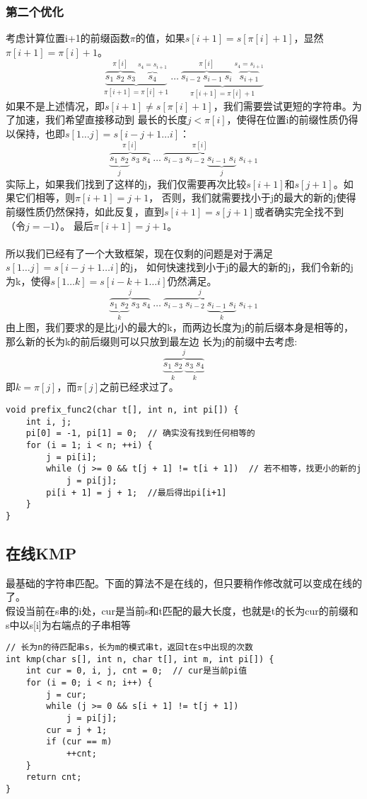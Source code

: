         \subsubsection{第二个优化}
            考虑计算位置i+1的前缀函数$\pi$的值，如果$s[i+1]=s[\pi[i]+1]$，显然$\pi[i+1]=\pi[i]+1$。
            $$ \underbrace{\overbrace{s_1 ~ s_2 ~ s_3}^{\pi[i]} ~ \overbrace{s_4}^{s_4 = s_{i+1}}}_{\pi[i+1] = \pi[i] + 1} ~ \dots ~ 
            \underbrace{\overbrace{s_{i-2} ~ s_{i-1} ~ s_{i}}^{\pi[i]} ~ \overbrace{s_{i+1}}^{s_4 = s_{i+1}}}_{\pi[i+1] = \pi[i] + 1} $$
            如果不是上述情况，即$s[i+1] \neq s[\pi[i]+1]$，我们需要尝试更短的字符串。为了加速，我们希望直接移动到
            最长的长度$j<\pi[i]$，使得在位置i的前缀性质仍得以保持，也即$s[1 \dots j] = s[i-j+1 \dots i]$：
            $$\overbrace{\underbrace{s_1 ~ s_2}_j ~ s_3 ~ s_4}^{\pi[i]} ~ \dots ~ \overbrace{s_{i-3} ~ s_{i-2} ~ \underbrace{s_{i-1} ~ s_{i}}_j}^{\pi[i]} ~ s_{i+1}$$
            实际上，如果我们找到了这样的j，我们仅需要再次比较$s[i+1]$和$s[j+1]$。如果它们相等，则$\pi[i+1]=j+1$，
            否则，我们就需要找小于j的最大的新的j使得前缀性质仍然保持，如此反复，直到$s[i+1]=s[j+1]$或者确实完全找不到（令$j=-1$）。
            最后$\pi[i+1]=j+1$。\\\\
            所以我们已经有了一个大致框架，现在仅剩的问题是对于满足$s[1 \dots j] = s[i-j+1 \dots i]$的j，
            如何快速找到小于j的最大的新的j，我们令新的j为k，使得$s[1 \dots k] = s[i-k+1 \dots i]$仍然满足。
            $$\overbrace{\underbrace{s_1 ~ s_2}_k ~ s_3 ~ s_4}^j ~ \dots ~ \overbrace{s_{i-3} ~ s_{i-2} ~ \underbrace{s_{i-1} ~ s_{i}}_k}^j ~s_{i+1}$$
            由上图，我们要求的是比j小的最大的k，而两边长度为j的前后缀本身是相等的，那么新的长为k的前后缀则可以只放到最左边
            长为j的前缀中去考虑:
            $$\overbrace{\underbrace{s_1 ~ s_2}_k ~ \underbrace{s_3 ~ s_4}_k}^j$$
            即$k=\pi[j]$，而$\pi[j]$之前已经求过了。
            \begin{lstlisting}
void prefix_func2(char t[], int n, int pi[]) {
    int i, j;
    pi[0] = -1, pi[1] = 0;  // 确实没有找到任何相等的
    for (i = 1; i < n; ++i) {
        j = pi[i];
        while (j >= 0 && t[j + 1] != t[i + 1])  // 若不相等，找更小的新的j
            j = pi[j];
        pi[i + 1] = j + 1;  //最后得出pi[i+1]
    }
}

            \end{lstlisting}
    \subsection{在线KMP}
        最基础的字符串匹配。下面的算法不是在线的，但只要稍作修改就可以变成在线的了。\\
        假设当前在s串的i处，cur是当前s和t匹配的最大长度，也就是t的长为cur的前缀和s中以s[i]为右端点的子串相等
        \begin{lstlisting}
// 长为n的待匹配串s，长为m的模式串t，返回t在s中出现的次数
int kmp(char s[], int n, char t[], int m, int pi[]) {
    int cur = 0, i, j, cnt = 0;  // cur是当前pi值
    for (i = 0; i < n; i++) {
        j = cur;
        while (j >= 0 && s[i + 1] != t[j + 1])
            j = pi[j];
        cur = j + 1;
        if (cur == m)
            ++cnt;
    }
    return cnt;
}
        \end{lstlisting}
